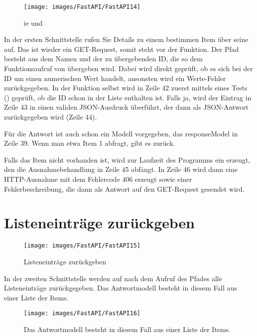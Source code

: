 \begin{figure}
    \texttt{[image: images/FastAPI/FastAPI14]}
    \caption{ie  und } \label{FastAPI14}
\end{figure}


In der ersten Schnittstelle rufen Sie Details zu einem bestimmen Item über seine  auf. Das ist wieder ein GET-Request, somit steht  vor der Funktion. Der Pfad besteht aus dem Namen  und der zu übergebenden ID, die so dem Funktionsaufruf von  übergeben wird. Dabei wird direkt geprüft, ob es sich bei der ID um einen numerischen Wert handelt, ansonsten wird ein Werte-Fehler zurückgegeben. In der Funktion selbst wird in Zeile 42 zuerst mittels eines Tests () geprüft, ob die ID schon in der Liste enthalten ist. Falls ja, wird der Eintrag in Zeile 43 in einen validen JSON-Ausdruck überführt, der dann als JSON-Antwort zurückgegeben wird (Zeile 44).

Für die Antwort ist auch schon ein Modell vorgegeben, das responseModel in Zeile 39. Wenn man etwa Item 1 abfragt, gibt es  zurück.

Falls das Item nicht vorhanden ist, wird zur Laufzeit des Programms ein  erzeugt, den die Ausnahmebehandlung in Zeile 45 abfängt. In Zeile 46 wird dann eine HTTP-Ausnahme mit dem Fehlercode 406 erzeugt sowie einer Fehlerbeschreibung, die dann als Antwort auf den GET-Request gesendet wird.

\section{Listeneinträge zurückgeben}

\begin{figure}
    \texttt{[image: images/FastAPI/FastAPI15]}
    \caption{Listeneinträge zurückgeben} \label{FastAPI15}
\end{figure}

In der zweiten Schnittstelle werden auf nach dem Aufruf des Pfades  alle Listeneinträge zurückgegeben. Das Antwortmodell besteht in diesem Fall aus einer Liste der Items.

\begin{figure}
    \texttt{[image: images/FastAPI/FastAPI16]}
    \caption{Das Antwortmodell besteht in diesem Fall aus einer Liste der Items.} \label{FastAPI16}
\end{figure}

